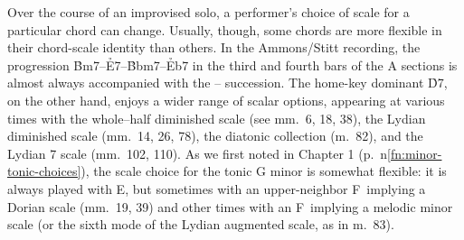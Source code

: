 Over the course of an improvised solo, a performer's choice of scale for a
particular chord can change. Usually, though, some chords are more flexible in
their chord-scale identity than others. In the Ammons/Stitt
recording, the progression \h{Bm7}--\h{E7}--\h{Bbm7}--\h{Eb7} in the third and
fourth bars of the A sections is almost always accompanied with the
-- succession. The
home-key dominant \h{D7}, on the other hand, enjoys a wider range of scalar
options, appearing at various times with the whole--half diminished scale (see
mm.~6, 18, 38), the Lydian diminished scale (mm.~14, 26, 78), the diatonic
collection (m.~82), and the Lydian \flat{}7 scale (mm.~102, 110). As we first
noted in Chapter 1
(p.~\pageref{fn:minor-tonic-choices}n\ref{fn:minor-tonic-choices}), the scale
choice for the tonic G minor is somewhat flexible: it is always played with
E\nat, but sometimes with an upper-neighbor F\nat\ implying a Dorian scale
(mm.~19, 39) and other times with an F\sharp\ implying a melodic minor scale
(or the sixth mode of the Lydian augmented scale, as in m.~83).


